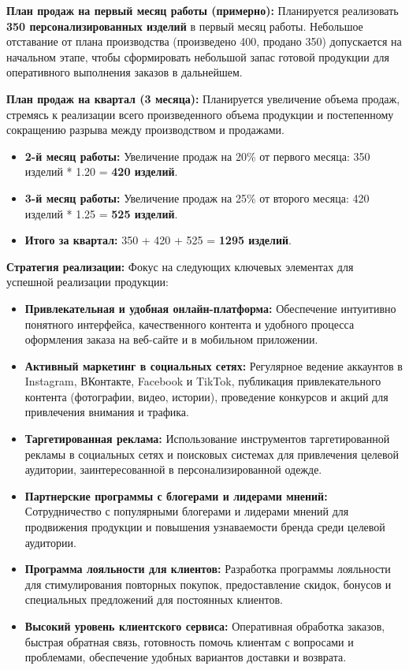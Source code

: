 \vspace{0.3cm}

\textbf{План продаж на первый месяц работы (примерно):}  Планируется реализовать \textbf{350 персонализированных изделий} в первый месяц работы.  Небольшое отставание от плана производства (произведено 400, продано 350) допускается на начальном этапе, чтобы сформировать небольшой запас готовой продукции для оперативного выполнения заказов в дальнейшем.

\vspace{0.3cm}

\textbf{План продаж на квартал (3 месяца):}  Планируется увеличение объема продаж, стремясь к реализации всего произведенного объема продукции и постепенному сокращению разрыва между производством и продажами.

\begin{itemize}
    \item \textbf{2-й месяц работы:} Увеличение продаж на 20\% от первого месяца: 350 изделий * 1.20 = \textbf{420 изделий}.
    \item \textbf{3-й месяц работы:} Увеличение продаж на 25\% от второго месяца: 420 изделий * 1.25 = \textbf{525 изделий}.
    \item \textbf{Итого за квартал:} 350 + 420 + 525 = \textbf{1295 изделий}.
\end{itemize}

\textbf{Стратегия реализации:}  Фокус на следующих ключевых элементах для успешной реализации продукции:

\begin{itemize}
    \item \textbf{Привлекательная и удобная онлайн-платформа:} Обеспечение интуитивно понятного интерфейса, качественного контента и удобного процесса оформления заказа на веб-сайте и в мобильном приложении.
    \item \textbf{Активный маркетинг в социальных сетях:}  Регулярное ведение аккаунтов в Instagram, ВКонтакте, Facebook и TikTok, публикация привлекательного контента (фотографии, видео, истории), проведение конкурсов и акций для привлечения внимания и трафика.
    \item \textbf{Таргетированная реклама:}  Использование инструментов таргетированной рекламы в социальных сетях и поисковых системах для привлечения целевой аудитории, заинтересованной в персонализированной одежде.
    \item \textbf{Партнерские программы с блогерами и лидерами мнений:}  Сотрудничество с популярными блогерами и лидерами мнений для продвижения продукции и повышения узнаваемости бренда среди целевой аудитории.
    \item \textbf{Программа лояльности для клиентов:}  Разработка программы лояльности для стимулирования повторных покупок, предоставление скидок, бонусов и специальных предложений для постоянных клиентов.
    \item \textbf{Высокий уровень клиентского сервиса:}  Оперативная обработка заказов, быстрая обратная связь, готовность помочь клиентам с вопросами и проблемами, обеспечение удобных вариантов доставки и возврата.
\end{itemize}

